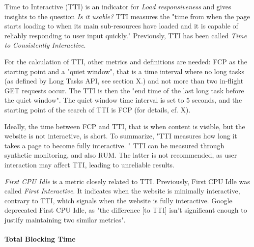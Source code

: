 
Time to Interactive (TTI) is an indicator for \textit{Load responsiveness} and gives insights to the question \textit{Is it usable?}
TTI measures the "time from when the page starts loading to when its main sub-resources have loaded and it is capable of reliably responding to user input quickly."
Previously, TTI has been called \textit{Time to Consistently Interactive}. %

For the calculation of TTI, other metrics and definitions are needed:
FCP as the starting point and a "quiet window", that is a time interval where no long tasks (as defined by Long Tasks API, see section X.) and not more than two in-flight GET requests occur. %
The TTI is then the "end time of the last long task before the quiet window".
The quiet window time interval is set to 5 seconds, and the starting point of the search of TTI is FCP (for details, cf. X).

Ideally, the time between FCP and TTI, that is when content is visible, but the website is not interactive, is short.
To summarize, "TTI measures how long it takes a page to become fully interactive. " %
TTI can be measured through synthetic monitoring, and also RUM.
The latter is not recommended, as user interaction may affect TTI, leading to unreliable results.



\textit{First CPU Idle} is a metric closely related to TTI.
Previously, First CPU Idle was called \textit{First Interactive}. %
It indicates when the website is minimally interactive, contrary to TTI, which signals when the website is fully interactive.
Google deprecated First CPU Idle, as "the difference [to TTI] isn't significant enough to justify maintaining two similar metrics". %





\paragraph{Total Blocking Time}


